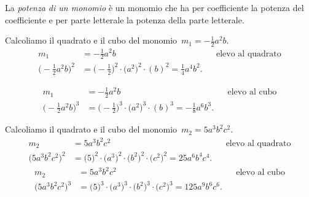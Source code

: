 % 
% 

\begin{definizione}
La \emph{potenza di un monomio} è un monomio
che ha per coefficiente la potenza del coefficiente e per parte
letterale la potenza della parte letterale.
\end{definizione}

\begin{exrig}
 \begin{esempio}
Calcoliamo il quadrato e il cubo del monomio~\(m_{1}=-{\frac{1}{2}}a^{2}b\).
\begin{align*}
m_{1}&=-{\frac{1}{2}}a^{2}b && \text{elevo al quadrato}\\
\bigg(-{\frac{1}{2}}a^{2}b\bigg)^{2}
&=\bigg(-{\frac{1}{2}}\bigg)^{2}\cdot\big(a^{2}\big)^{2}\cdot (b)^{2}
=\frac{1}{4}a^{4}b^{2}.
\end{align*}

\begin{align*}
m_{1}&=-{\frac{1}{2}}a^{2}b &&\text{elevo al cubo}\\
\bigg(-{\frac{1}{2}}a^{2}b\bigg)^{3}
&=\bigg(-{\frac{1}{2}}\bigg)^{3}\cdot\big(a^{2}\big)^{3}\cdot (b)^{3}
=-{\frac{1}{8}}a^{6}b^{3}.
\end{align*}
 \end{esempio}

 \begin{esempio}
Calcoliamo il quadrato e il cubo del monomio~\(m_{2}=5a^{3}b^{2}c^{2}\).
\begin{align*}
m_{2}&=5a^{3}b^{2}c^{2} &&\text{elevo al quadrato}\\
\big(5a^{3}b^{2}c^{2}\big)^{2}
&=\big(5\big)^{2}\cdot \big(a^{3}\big)^{2}\cdot\big(b^{2}\big)^{2}\cdot 
\big(c^{2}\big)^{2}
=25a^{6}b^{4}c^{4}.
\end{align*}
\begin{align*}
m_{2}&=5a^{3}b^{2}c^{2} &&\text{elevo al cubo}\\
\big(5a^{3}b^{2}c^{2}\big)^{3}
&=\big(5\big)^{3}\cdot \big(a^{3}\big)^{3}\cdot\big(b^{2}\big)^{3}\cdot 
\big(c^{2}\big)^{3}
=125a^{9}b^{6}c^{6}.
\end{align*}
 \end{esempio}
\end{exrig}

